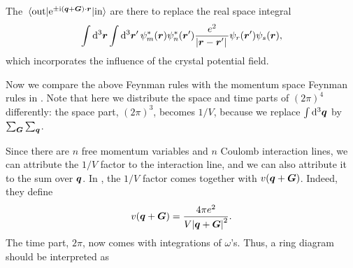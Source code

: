 \documentclass[hyperref, a4paper, 12pt]{report}
\newcommand*{\ii}{\mathrm{i}}
\newcommand*{\ee}{\mathrm{e}}
\begin{document}
The $\mel*{\text{out}}{\ee^{\pm \ii (\vb*{q} + \vb*{G}) \cdot \vb*{r}}}{\text{in}}$
are there to replace the real space integral 
\[
    \int \dd[3]{\vb*{r}} \int \dd[3]{\vb*{r}'} 
    \psi_m^*(\vb*{r}) \psi^*_{n}(\vb*{r}')
    \frac{e^2}{\abs*{\vb*{r} - \vb*{r}'}}
    \psi_r(\vb*{r}') \psi_s(\vb*{r}),
\]
which incorporates the influence of the crystal potential field.

Now we compare the above Feynman rules with 
the momentum space Feynman rules in .
Note that here we distribute the space and time parts of $(2\pi)^4$ differently:
the space part, $(2\pi)^3$,
becomes $1/V$, because we replace $\int \dd[3]{\vb*{q}}$ by $\sum_{\vb*{G}} \sum_{\vb*{q}}$.

Since there are $n$ free momentum variables 
and $n$ Coulomb interaction lines, 
we can attribute the $1/V$ factor to the interaction line,
and we can also attribute it to the sum over $\vb*{q}$.
In \cite{hybertsen1986electron}, 
the $1/V$ factor comes together with $v(\vb*{q} + \vb*{G})$.
Indeed, they define 
\begin{equation}
    v(\vb*{q} + \vb*{G}) = \frac{4\pi e^2}{V \abs{\vb*{q} + \vb*{G}}^2}.
    \label{eq:v-contain-V}
\end{equation}
The time part, $2\pi$,
now comes with integrations of $\omega$'s.
Thus, a ring diagram should be interpreted as 
\end{document}
